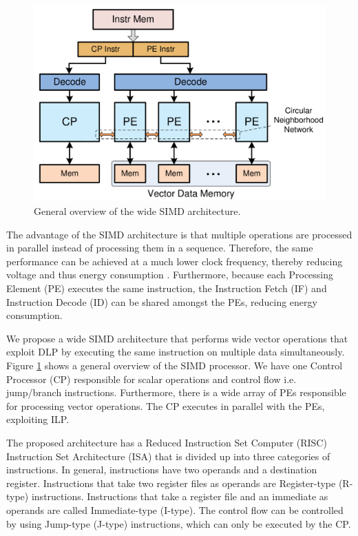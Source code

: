 
\begin{figure}[t]
\centering
\includegraphics[width=.6\textwidth]{figures/simd_overview}
\caption{General overview of the wide SIMD architecture.}
\label{fig:simd_overview}
\end{figure}

The advantage of the SIMD architecture is that multiple operations are processed in parallel instead of processing them in a sequence. Therefore, the same performance can be achieved at a much lower clock frequency, thereby reducing voltage and thus energy consumption \cite{dongrio1}. Furthermore, because each Processing Element (PE) executes the same instruction, the Instruction Fetch (IF) and Instruction Decode (ID) can be shared amongst the PEs, reducing energy consumption.

We propose a wide SIMD architecture \cite{simd} that performs wide vector operations that exploit DLP by executing the same instruction on multiple data simultaneously. Figure \ref{fig:simd_overview} shows a general overview of the SIMD processor.
We have one Control Processor (CP) responsible for scalar operations and control flow i.e. jump/branch instructions. Furthermore, there is a wide array of PEs responsible for processing vector operations. The CP executes in parallel with the PEs, exploiting ILP.

The proposed architecture has a Reduced Instruction Set Computer (RISC) Instruction Set Architecture (ISA) that is divided up into three categories of instructions. In general, instructions have two operands and a destination register. Instructions that take two register files as operands are Register-type (R-type) instructions. Instructions that take a register file and an immediate as operands are called Immediate-type (I-type). The control flow can be controlled by using Jump-type (J-type) instructions, which can only be executed by the CP.

